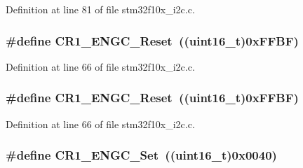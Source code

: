 Definition at line 81 of file stm32f10x\+\_\+i2c.\+c.

\subsubsection[{\texorpdfstring{C\+R1\+\_\+\+E\+N\+G\+C\+\_\+\+Reset}{CR1_ENGC_Reset}}]{\setlength{\rightskip}{0pt plus 5cm}\#define C\+R1\+\_\+\+E\+N\+G\+C\+\_\+\+Reset~(({\bf uint16\+\_\+t})0x\+F\+F\+B\+F)}\hypertarget{group___i2_c___private___defines_gab51161052b055a5eecb0aad447a776e5}{}\label{group___i2_c___private___defines_gab51161052b055a5eecb0aad447a776e5}


Definition at line 66 of file stm32f10x\+\_\+i2c.\+c.

\subsubsection[{\texorpdfstring{C\+R1\+\_\+\+E\+N\+G\+C\+\_\+\+Reset}{CR1_ENGC_Reset}}]{\setlength{\rightskip}{0pt plus 5cm}\#define C\+R1\+\_\+\+E\+N\+G\+C\+\_\+\+Reset~(({\bf uint16\+\_\+t})0x\+F\+F\+B\+F)}\hypertarget{group___i2_c___private___defines_gab51161052b055a5eecb0aad447a776e5}{}\label{group___i2_c___private___defines_gab51161052b055a5eecb0aad447a776e5}


Definition at line 66 of file stm32f10x\+\_\+i2c.\+c.

\subsubsection[{\texorpdfstring{C\+R1\+\_\+\+E\+N\+G\+C\+\_\+\+Set}{CR1_ENGC_Set}}]{\setlength{\rightskip}{0pt plus 5cm}\#define C\+R1\+\_\+\+E\+N\+G\+C\+\_\+\+Set~(({\bf uint16\+\_\+t})0x0040)}\hypertarget{group___i2_c___private___defines_gadcd99a681046a2315f4bc72c9f461f0e}{}\label{group___i2_c___private___defines_gadcd99a681046a2315f4bc72c9f461f0e}


